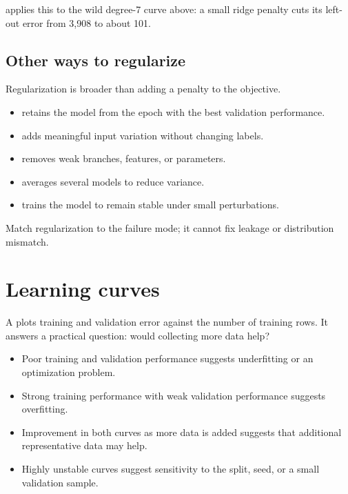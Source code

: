  applies this to the wild degree-7 curve above: a small ridge penalty cuts its left-out error from 3,908 to about 101.

\subsection{Other ways to regularize}

Regularization is broader than adding a penalty to the objective.

\begin{itemize}
  \item {} retains the model from the epoch with the best validation performance.
  \item {} adds meaningful input variation without changing labels.
    \item {} removes weak branches, features, or parameters.
  \item {} averages several models to reduce variance.
  \item {} trains the model to remain stable under small perturbations.
\end{itemize}

Match regularization to the failure mode; it cannot fix leakage or distribution mismatch.

\section{Learning curves}

A  plots training and validation error against the number of training rows. It answers a practical question: would collecting more data help?

\begin{itemize}
  \item Poor training and validation performance suggests underfitting or an optimization problem.
  \item Strong training performance with weak validation performance suggests overfitting.
  \item Improvement in both curves as more data is added suggests that additional representative data may help.
  \item Highly unstable curves suggest sensitivity to the split, seed, or a small validation sample.
\end{itemize}

